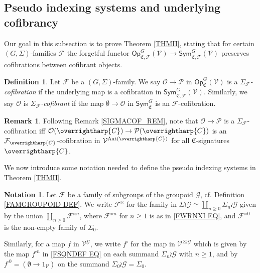 \documentclass[a4paper,10pt
,draft
]{article}%
\numberwithin{equation}{section}
\numberwithin{figure}{section}
\theoremstyle{definition} %
\newtheorem{definition}[equation]{Definition}%
\newtheorem{remark}[equation]{Remark}%
\newtheorem{notation}[equation]{Notation}%
\newcommand{\vect}[1]{\text{\overrightharp{\ensuremath{#1}}}}
\newcommand{\Sym}{\ensuremath{\mathsf{Sym}}}%
\newcommand{\Op}{\mathsf{Op}}%
\DeclareMathOperator{\Aut}{Aut}%
\newcommand{\F}{\ensuremath{\mathcal F}}
\newcommand{\V}{\ensuremath{\mathcal V}}
\renewcommand{\O}{\ensuremath{\mathcal O}}
\renewcommand{\P}{\ensuremath{\mathcal P}}
\newcommand{\G}{\ensuremath{\mathcal G}}
\newcommand{\1}{\ensuremath{\mathbbm 1}}%
\begin{document}
\subsection{Pseudo indexing systems and underlying cofibrancy}
\label{INDSYS_SEC}



Our goal in this subsection is to prove Theorem \ref{THMII},
stating that 
for certain $(G,\Sigma)$-families $\F$
the forgetful functor
$\Op^G_{\mathfrak C, \F}(\V) \to \Sym^G_{\mathfrak C, \F}(\V)$ preserves cofibrations between cofibrant objects.


\begin{definition}
	Let $\F$ be a $(G,\Sigma)$-family.
	We say $\O \to \P$ in $\Op^G_{\mathfrak C}(\V)$
	is a \textit{$\Sigma_\F$-cofibration}
	if the underlying map is a cofibration in $\Sym^G_{\mathfrak C, \F}(\V)$.
	Similarly, we say    
	$\O$ is \textit{$\Sigma_\F$-cofibrant} if 
	the map $\emptyset \to \O$
	in $\mathsf{Sym}^G_{\mathfrak{C}}$ is an $\F$-cofibration.
\end{definition}


\begin{remark}
	Following Remark \ref{SIGMACOF_REM}, 
	note that 
	$\O \to \P$ is a $\Sigma_\F$-cofibration iff 
	$\O(\vect C) \to \P(\vect C)$ is an $\mathcal F_{\vect C}$-cofibration in $\V^{\Aut(\vect C)}$
	for all $\mathfrak C$-signatures $\vect C$.
\end{remark} 



We now introduce some notation needed
to define the pseudo indexing systems in Theorem \ref{THMII}.



\begin{notation}\label{FSQUARE_NOT}
	Let $\F$ be a family of subgroups of the groupoid $\G$,
	cf. Definition \ref{FAMGROUPOID DEF}.
	We write $\F^{\ltimes}$
	for the family in 
	$\Sigma \wr \G \simeq \coprod_{n \geq 0} \Sigma_{n} \wr \G$
	given by the union
	$\coprod_{n \geq 0} \F^{\ltimes n}$,
	where $\F^{\ltimes n}$ for $n\geq 1$
	is as in \eqref{FWRNXI EQ},
	and $\F^{\ltimes 0}$ is the non-empty family of $\Sigma_0$.
	
	Similarly, for a map $f$ in $\V^{\mathcal G}$, 
	we write $f^{\square}$ for the map in $\V^{\Sigma \wr \mathcal G}$
	which is given by the map $f^{\square n}$
	in \eqref{FSQNDEF EQ}
	on each summand $\Sigma_n \wr \mathcal{G}$ with $n \geq 1$,
	and by $f^{\square 0} = (\emptyset \to 1_{\V})$
	on the summand 
	$\Sigma_0 \wr \mathcal{G} = \Sigma_0$.
\end{notation}
\end{document}
